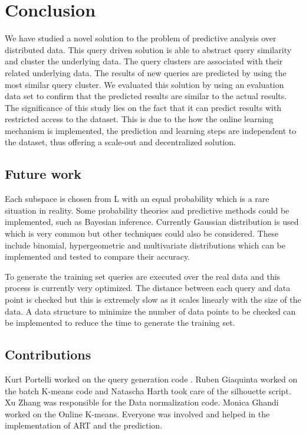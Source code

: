 \documentclass{lmproj}
\begin{document}
\chapter{Conclusion}
We have studied a novel solution to the problem of predictive analysis over distributed data. This query driven solution is able to abstract query similarity and cluster the underlying data. The query clusters are associated with their related underlying data. The results of new queries are predicted by using the most similar query cluster. We evaluated this solution by using an evaluation data set to confirm that the predicted results are similar to the actual results. The significance of this study lies on the fact that it can predict results with restricted access to the dataset. This is due to the how the online learning mechanism is implemented, the prediction and learning steps are independent to the dataset, thus offering a scale-out and decentralized solution. 

\section{Future work}

Each subspace is chosen from L with an equal probability which is a rare situation in reality. Some probability theories and predictive methods could be implemented, such as Bayesian inference. Currently Gaussian distribution is used which is very common but other techniques could also be considered. These include binomial, hypergeometric and multivariate distributions which can be implemented and tested to compare their accuracy.

To generate the training set queries are executed over the real data and this process is currently very optimized. The distance between each query and data point is checked but this is extremely slow as it scales linearly with the size of the data. A data structure to minimize the number of data points to be checked can be implemented to reduce the time to generate the training set.

\section{Contributions}
Kurt Portelli worked on the 
query generation code 
. Ruben Giaquinta worked on the batch K-means code and %
Natascha Harth took care of the 
silhouette script. Xu Zhang was responsible for the 
Data normalization code. Monica Ghandi worked on the Online K-means. Everyone was involved and helped in the implementation of ART and the prediction. %


\end{document}
